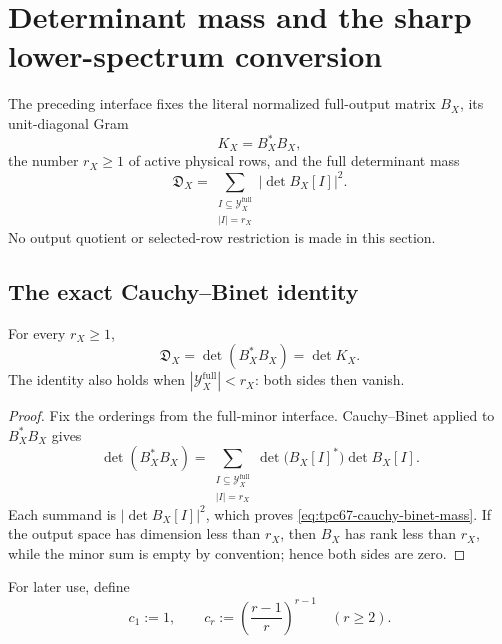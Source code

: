 \section{Determinant mass and the sharp lower-spectrum conversion}
\label{sec:tpc67-determinant-mass}

The preceding interface fixes the literal normalized full-output matrix
\(B_X\), its unit-diagonal Gram
\[
 K_X=B_X^*B_X,
\]
the number \(r_X\ge1\) of active physical rows, and the full determinant
mass
\[
 \mathfrak D_X
 =
 \sum_{\substack{I\subseteq\mathcal Y_X^{\mathrm{full}}\\|I|=r_X}}
 |\det B_X[I]|^2.
\]
No output quotient or selected-row restriction is made in this section.

\subsection{The exact Cauchy--Binet identity}

\begin{theorem}
\label{thm:tpc67-cauchy-binet-mass}
For every \(r_X\ge1\),
\begin{equation}
 \boxed{\qquad
 \mathfrak D_X=\det(B_X^*B_X)=\det K_X.
 \qquad}
 \label{eq:tpc67-cauchy-binet-mass}
\end{equation}
The identity also holds when
\(|\mathcal Y_X^{\mathrm{full}}|<r_X\): both sides then vanish.
\end{theorem}

\begin{proof}
Fix the orderings from the full-minor interface.  Cauchy--Binet applied
to \(B_X^*B_X\) gives
\[
 \det(B_X^*B_X)
 =
 \sum_{\substack{I\subseteq\mathcal Y_X^{\mathrm{full}}\\|I|=r_X}}
 \det\!\bigl(B_X[I]^*\bigr)\det B_X[I].
\]
Each summand is \(|\det B_X[I]|^2\), which proves
\eqref{eq:tpc67-cauchy-binet-mass}.  If the output space has dimension
less than \(r_X\), then \(B_X\) has rank less than \(r_X\), while the
minor sum is empty by convention; hence both sides are zero.
\end{proof}

For later use, define
\begin{equation}
 c_1:=1,
 \qquad
 c_r:=\left(\frac{r-1}{r}\right)^{r-1}
 \quad(r\ge2).
 \label{eq:tpc67-sharp-determinant-constant}
\end{equation}

